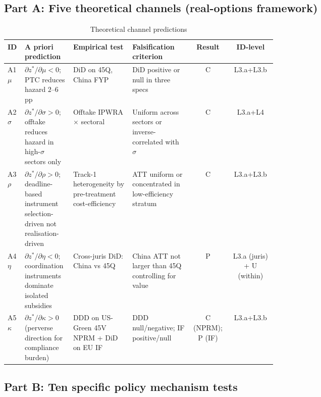 \subsection*{Part A: Five theoretical channels (real-options framework)}

\begin{table}[!htbp]
\centering
\caption{Theoretical channel predictions}
\label{tab:app-mech-A}
\small
\begin{tabular}{lp{0.18\linewidth}p{0.22\linewidth}p{0.22\linewidth}cc}
\toprule
ID & A priori prediction & Empirical test & Falsification criterion & Result & ID-level \\
\midrule
A1 $\mu$ & $\partial z^*/\partial \mu < 0$; PTC reduces hazard $2$--$6$pp & DiD on 45Q, China FYP & DiD positive or null in three specs & C & L3.a+L3.b \\
A2 $\sigma$ & $\partial z^*/\partial \sigma > 0$; offtake reduces hazard in high-$\sigma$ sectors only & Offtake IPWRA $\times$ sectoral & Uniform across sectors or inverse-correlated with $\sigma$ & C & L3.a+L4 \\
A3 $\rho$ & $\partial z^*/\partial \rho > 0$; deadline-based instrument selection-driven not realisation-driven & Track-1 heterogeneity by pre-treatment cost-efficiency & ATT uniform or concentrated in low-efficiency stratum & C & L3.a+L3.b \\
A4 $\eta$ & $\partial z^*/\partial \eta < 0$; coordination instruments dominate isolated subsidies & Cross-juris DiD: China vs 45Q & China ATT not larger than 45Q controlling for value & P & L3.a (juris) + U (within) \\
A5 $\kappa$ & $\partial z^*/\partial \kappa > 0$ (perverse direction for compliance burden) & DDD on US-Green 45V NPRM + DiD on EU IF & DDD null/negative; IF positive/null & C (NPRM); P (IF) & L3.a+L3.b \\
\bottomrule
\end{tabular}
\end{table}

\subsection*{Part B: Ten specific policy mechanism tests}

